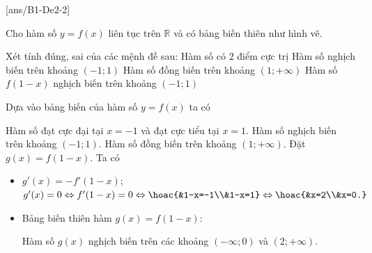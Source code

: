 \BTTF
{}[ans/B1-De2-2]

\begin{ex}%
    Cho hàm số $y=f(x)$ liên tục trên $\mathbb{R}$ và có bảng biến thiên như hình vẽ.
    \begin{center}
    \end{center}
    Xét tính đúng, sai của các mệnh đề sau:
    \choiceTF
    {\True Hàm số có $2$ điểm cực trị}
    {\True Hàm số nghịch biến trên khoảng $(-1;1)$}
    {\True Hàm số đồng biến trên khoảng $(1;+\infty)$}
    {Hàm số $f(1-x)$ nghịch biến trên khoảng $(-1;1)$}
    \loigiai
    {Dựa vào bảng biến của hàm số $y=f(x)$ ta có
        \begin{itemchoice}
            \itemch Hàm số đạt cực đại tại $x=-1$ và đạt cực tiểu tại $x=1$.
            \itemch Hàm số nghịch biến trên khoảng $(-1;1)$.
            \itemch Hàm số đồng biến trên khoảng $(1;+\infty)$.
            \itemch Đặt $g(x)=f(1-x)$. Ta có
            \begin{itemize}
                \item [$\bullet$] $g'(x)=-f'(1-x)$; \\
                $g'(x)=0 \Leftrightarrow f'(1-x)=0 \Leftrightarrow \hoac{&1-x=-1\\&1-x=1}\Leftrightarrow \hoac{&x=2\\&x=0.}$
                \item [$\bullet$] Bảng biến thiên hàm $g(x)=f(1-x)$:
                \begin{center}
                \end{center}
                Hàm số $g(x)$ nghịch biến trên các khoảng $(-\infty;0)$ và $(2;+\infty)$.
            \end{itemize}
        \end{itemchoice}
    }
\end{ex}


